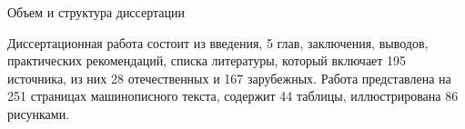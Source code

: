 
     Объем и структура диссертации

     Диссертационная работа состоит из введения, 5 глав, заключения, выводов,
практических рекомендаций, списка         литературы, который включает 195
источника, из них 28 отечественных и 167 зарубежных. Работа представлена на
251 страницах машинописного текста, содержит 44 таблицы, иллюстрирована 86
рисунками.
